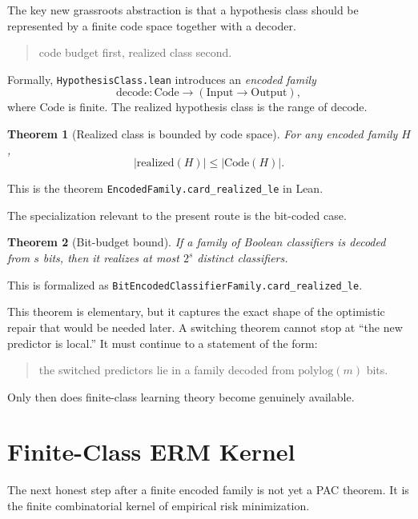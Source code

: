 \documentclass[11pt]{article}
\newtheorem{theorem}{Theorem}[section]
\theoremstyle{remark}
\begin{document}
The key new grassroots abstraction is that a hypothesis class should be represented
by a finite code space together with a decoder.

\begin{quote}
code budget first, realized class second.
\end{quote}

Formally, \texttt{HypothesisClass.lean} introduces an \emph{encoded family}
\[
  \mathrm{decode} : \mathrm{Code} \to (\mathrm{Input} \to \mathrm{Output}),
\]
where \(\mathrm{Code}\) is finite.  The realized hypothesis class is the range of
\(\mathrm{decode}\).

\begin{theorem}[Realized class is bounded by code space]
For any encoded family \(H\),
\[
  |\mathrm{realized}(H)| \le |\mathrm{Code}(H)|.
\]
\end{theorem}

\noindent
This is the theorem \texttt{EncodedFamily.card\_realized\_le} in Lean.

The specialization relevant to the present route is the bit-coded case.

\begin{theorem}[Bit-budget bound]
If a family of Boolean classifiers is decoded from \(s\) bits, then it realizes at
most \(2^s\) distinct classifiers.
\end{theorem}

\noindent
This is formalized as
\texttt{BitEncodedClassifierFamily.card\_realized\_le}.

This theorem is elementary, but it captures the exact shape of the optimistic
repair that would be needed later.  A switching theorem cannot stop at ``the new
predictor is local.''  It must continue to a statement of the form:

\begin{quote}
the switched predictors lie in a family decoded from \(\mathrm{polylog}(m)\) bits.
\end{quote}

Only then does finite-class learning theory become genuinely available.

\section{Finite-Class ERM Kernel}

The next honest step after a finite encoded family is not yet a PAC theorem.
It is the finite combinatorial kernel of empirical risk minimization.
\end{document}

